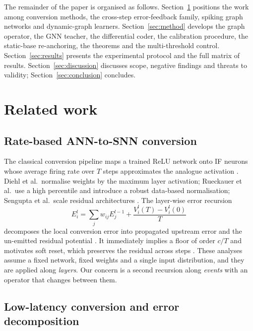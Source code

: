 \documentclass[preprint,12pt]{elsarticle}
\begin{document}
The remainder of the paper is organised as follows. Section~\ref{sec:related} positions the work among conversion methods, the cross-step error-feedback family, spiking graph networks and dynamic-graph learners. Section~\ref{sec:method} develops the graph operator, the GNN teacher, the differential coder, the calibration procedure, the static-base re-anchoring, the theorems and the multi-threshold control. Section~\ref{sec:results} presents the experimental protocol and the full matrix of results. Section~\ref{sec:discussion} discusses scope, negative findings and threats to validity; Section~\ref{sec:conclusion} concludes.

\section{Related work}
\label{sec:related}

\subsection{Rate-based ANN-to-SNN conversion}

The classical conversion pipeline maps a trained ReLU network onto IF neurons whose average firing rate over $T$ steps approximates the analogue activation \cite{cao2015spiking,diehl2015,rueckauer2017}. Diehl et al.\ normalise weights by the maximum layer activation; Rueckauer et al.\ use a high percentile and introduce a robust data-based normalisation; Sengupta et al.\ scale residual architectures \cite{sengupta2019going}. The layer-wise error recursion
\begin{equation}
E_i^{l}=\sum_j w_{ij}E_j^{l-1}+\frac{V_i^{l}(T)-V_i^{l}(0)}{T}
\label{eq:layer}
\end{equation}
decomposes the local conversion error into propagated upstream error and the un-emitted residual potential \cite{habara2024}. It immediately implies a floor of order $c/T$ and motivates soft reset, which preserves the residual across steps \cite{han2020rmp}. These analyses assume a fixed network, fixed weights and a single input distribution, and they are applied along \emph{layers}. Our concern is a second recursion along \emph{events} with an operator that changes between them.

\subsection{Low-latency conversion and error decomposition}
\end{document}
